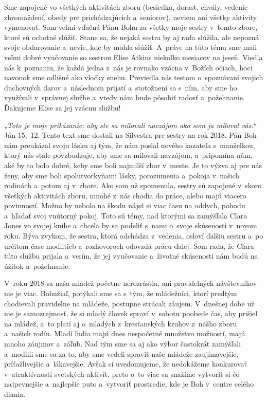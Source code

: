 Sme zapojené vo všetkých aktivitách zboru (besiedka, dorast, chvály, vedenie zhromaždení, obedy pre prichádzajúcich a~seniorov), neviem ani všetky aktivity vymenovať. Som veľmi vďačná Pánu Bohu za všetky moje sestry v~tomto zbore, ktoré sú ochotné slúžiť.
Stane sa, že nejaká sestra by aj rada slúžila, ale nepozná svoje obdarovanie a~nevie, kde by mohla slúžiť. A~práve na túto tému sme mali veľmi dobré vyučovanie so sestrou Elise Atkins niekoľko mesiacov na jeseň. Viedla nás k~poznaniu, že každá jedna z~nás je rovnako vzácna v~Božích očiach, hoci navonok sme odlišné ako vločky snehu. Previedla nás testom o~spoznávaní svojich duchovných darov a~následnom prijatí a~stotožnení sa s~ním, aby sme ho využívali v~správnej službe a~vtedy nám bude pôsobiť radosť a~požehnanie. Ďakujeme Elise za jej vzácnu službu!

{\it „Toto je moje prikázanie: aby ste sa milovali navzájom ako som ja miloval vás.“} Ján 15,~12. Tento text sme dostali na Silvestra pre sestry na rok 2018. Pán Boh nám preukázal svoju lásku aj tým, že nám poslal nového kazateľa s~manželkou, ktorý nás stále povzbudzuje, aby sme sa milovali navzájom, a~pripomína nám, aké by to bolo dobré, keby sme boli najmilší zbor v~meste. Je to výzva aj pre nás ženy, aby sme boli spolutvorkyňami lásky, porozumenia a~pokoja v~našich rodinách a~potom aj v~zbore. Ako som už spomenula, sestry sú zapojené v~skoro všetkých aktivitách zboru, mnohé z~nás chodia do práce, alebo majú viacero povinností. Možno by nebolo na škodu nájsť si viac času na oddych, pohodu a~hľadať svoj vnútorný pokoj. Toto sú témy, nad ktorými sa zamýšľala Clara Jones vo svojej knihe a~chcela by sa podeliť s~nami o~svoje skúsenosti v~novom roku. Býva zvykom, že sestra, ktorá odchádza z~vedenia, osloví ďalšiu sestru a~po určitom čase modlitieb a~rozhovoroch odovzdá prácu ďalej. Som rada, že Clara túto službu prijala a~verím, že jej vyučovanie a~životné skúsenosti nám budú na úžitok a~požehnanie.



V~roku 2018 sa naša mládež početne nerozrástla, ani pravidelných návštevníkov nie je viac. Bohužiaľ, potýkali sme sa s~tým, že mládežníci, ktorí predtým chodievali pravidelne na mládeže, postupne strácali záujem. V~dnešnej dobe už nie je samozrejmosť, že si mladý človek spraví v~sobotu poobede čas, aby prišiel na mládež, a~to platí aj o~mladých z~kresťanských kruhov z~nášho zboru a~našich rodín. Mladí ľudia majú dnes nespočetné množstvo možností, majú mnoho záujmov a~záľub. Nad tým sme sa aj ako výbor častokrát zamýšľali a~modlili sme sa za to, aby sme vedeli spraviť naše mládeže zaujímavejšie, príťažlivejšie a~lákavejšie. Avšak si uvedomujeme, že nedokážeme konkurovať v~atraktívnosti svetských aktivít, preto o~to viac sa snažíme vytvoriť si čo najpevnejšie a~najlepšie puto a~vytvoriť prostredie, kde je Boh v~centre celého diania.

